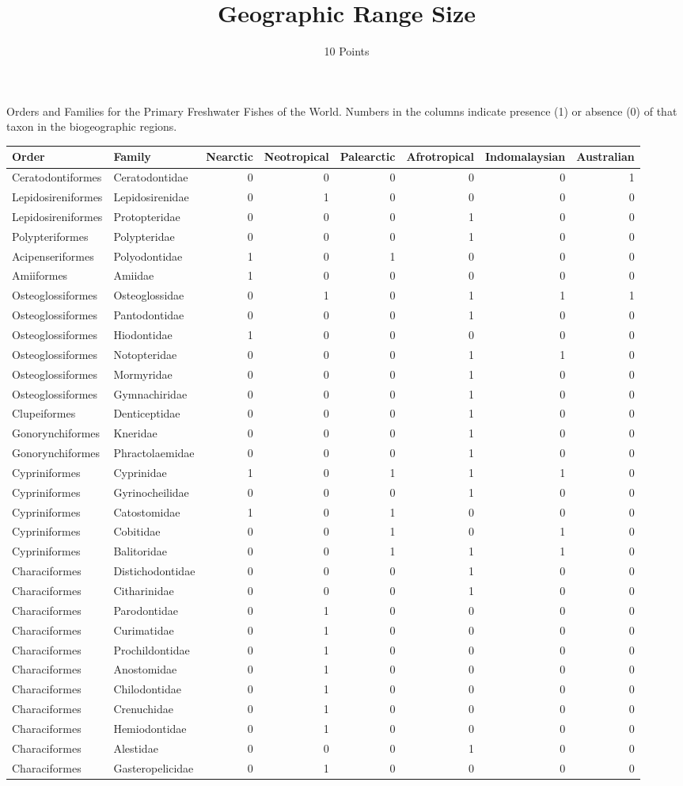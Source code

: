 \documentclass[11pt]{article}
\title{Geographic Range Size}
\author{10 Points}
\date{}                                           %
\begin{document}

Orders and Families for the Primary Freshwater Fishes of the World. Numbers in the columns indicate presence (1) or absence (0) of that taxon in the biogeographic regions.

\begin{longtable}[l]{@{}llrrrrrr@{}}
\toprule
Order & Family & Nearctic &
Neotropical & Palearctic & Afrotropical &
Indomalaysian & Australian\tabularnewline
\midrule
\endhead
Ceratodontiformes & Ceratodontidae & 0 & 0 & 0 & 0 & 0 &
1\tabularnewline
Lepidosireniformes & Lepidosirenidae & 0 & 1 & 0 & 0 & 0 &
0\tabularnewline
Lepidosireniformes & Protopteridae & 0 & 0 & 0 & 1 & 0 &
0\tabularnewline
Polypteriformes & Polypteridae & 0 & 0 & 0 & 1 & 0 & 0\tabularnewline
Acipenseriformes & Polyodontidae & 1 & 0 & 1 & 0 & 0 & 0\tabularnewline
Amiiformes & Amiidae & 1 & 0 & 0 & 0 & 0 & 0\tabularnewline
Osteoglossiformes & Osteoglossidae & 0 & 1 & 0 & 1 & 1 &
1\tabularnewline
Osteoglossiformes & Pantodontidae & 0 & 0 & 0 & 1 & 0 & 0\tabularnewline
Osteoglossiformes & Hiodontidae & 1 & 0 & 0 & 0 & 0 & 0\tabularnewline
Osteoglossiformes & Notopteridae & 0 & 0 & 0 & 1 & 1 & 0\tabularnewline
Osteoglossiformes & Mormyridae & 0 & 0 & 0 & 1 & 0 & 0\tabularnewline
Osteoglossiformes & Gymnachiridae & 0 & 0 & 0 & 1 & 0 & 0\tabularnewline
Clupeiformes & Denticeptidae & 0 & 0 & 0 & 1 & 0 & 0\tabularnewline
Gonorynchiformes & Kneridae & 0 & 0 & 0 & 1 & 0 & 0\tabularnewline
Gonorynchiformes & Phractolaemidae & 0 & 0 & 0 & 1 & 0 &
0\tabularnewline
Cypriniformes & Cyprinidae & 1 & 0 & 1 & 1 & 1 & 0\tabularnewline
Cypriniformes & Gyrinocheilidae & 0 & 0 & 0 & 1 & 0 & 0\tabularnewline
Cypriniformes & Catostomidae & 1 & 0 & 1 & 0 & 0 & 0\tabularnewline
Cypriniformes & Cobitidae & 0 & 0 & 1 & 0 & 1 & 0\tabularnewline
Cypriniformes & Balitoridae & 0 & 0 & 1 & 1 & 1 & 0\tabularnewline
Characiformes & Distichodontidae & 0 & 0 & 0 & 1 & 0 & 0\tabularnewline
Characiformes & Citharinidae & 0 & 0 & 0 & 1 & 0 & 0\tabularnewline
Characiformes & Parodontidae & 0 & 1 & 0 & 0 & 0 & 0\tabularnewline
Characiformes & Curimatidae & 0 & 1 & 0 & 0 & 0 & 0\tabularnewline
Characiformes & Prochildontidae & 0 & 1 & 0 & 0 & 0 & 0\tabularnewline
Characiformes & Anostomidae & 0 & 1 & 0 & 0 & 0 & 0\tabularnewline
Characiformes & Chilodontidae & 0 & 1 & 0 & 0 & 0 & 0\tabularnewline
Characiformes & Crenuchidae & 0 & 1 & 0 & 0 & 0 & 0\tabularnewline
Characiformes & Hemiodontidae & 0 & 1 & 0 & 0 & 0 & 0\tabularnewline
Characiformes & Alestidae & 0 & 0 & 0 & 1 & 0 & 0\tabularnewline
Characiformes & Gasteropelicidae & 0 & 1 & 0 & 0 & 0 & 0\tabularnewline

\end{longtable}
\end{document}
